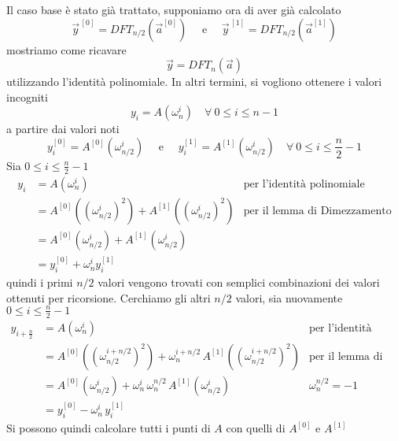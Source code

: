 Il caso base è stato già trattato, supponiamo ora di aver già calcolato 
\begin{equation*}
    \vec{y}^{\,[0]} = DFT_{n/2} \left( \vec{a}^{[0]} \right)
    \quad \text{ e } \quad
    \vec{y}^{\,[1]} = DFT_{n/2} \left( \vec{a}^{[1]} \right)
\end{equation*}
mostriamo come ricavare
\begin{equation*}
    \vec{y} = DFT_{n} \left( \vec{a} \right)
\end{equation*}
utilizzando l'identità polinomiale.
In altri termini, si vogliono ottenere i valori incogniti 
\begin{equation*}
    y_i = A \left( \omega_{n}^{i} \right)
    \quad \forall \: 0 \leq i \leq n-1
\end{equation*}
a partire dai valori noti
\begin{equation*}
    y_i^{[0]} = A^{[0]} \left( \omega_{n/2}^{i} \right)
    \quad \text{ e } \quad
    y_i^{[1]} = A^{[1]} \left( \omega_{n/2}^{i} \right)
    \quad \forall \: 0 \leq i \leq \frac{n}{2}-1
\end{equation*}
Sia $0 \leq i \leq \frac{n}{2}-1$
\begin{align*}
    y_i &= A \left( \omega_{n}^{i} \right) 
    & \text{per l'identità polinomiale}
    \\
    &= A^{[0]} \left( \left( \omega_{n/2}^{i} \right)^2 \right) +
    A^{[1]} \left( \left( \omega_{n/2}^{i} \right)^2 \right)
    & \text{per il lemma di Dimezzamento}
    \\
    &= A^{[0]} \left( \omega_{n/2}^{i} \right) +
    A^{[1]} \left( \omega_{n/2}^{i} \right)
    \\
    &= y_i^{[0]} + \omega_{n}^{i} y_i^{[1]} 
\end{align*}
quindi i primi $n/2$ valori vengono trovati con semplici combinazioni dei valori ottenuti per ricorsione. Cerchiamo gli altri $n/2$ valori, sia nuovamente $0 \leq i \leq \frac{n}{2}-1$
\begin{align*}
    y_{i+\frac{n}{2}} &= A \left( \omega_{n}^{i} \right) 
    & \text{per l'identità polinomiale}
    \\
    &= A^{[0]} \left( \left( \omega_{n/2}^{i+n/2} \right)^2 \right) +
    \omega_{n}^{i+n/2} \,
    A^{[1]} \left( \left( \omega_{n/2}^{i+n/2} \right)^2 \right)
    & \text{per il lemma di Dimezzamento}
    \\
    &= A^{[0]} \left( \omega_{n/2}^{i} \right) +
    \omega_{n}^{i} \,
    \omega_{n}^{n/2} \,
    A^{[1]} \left( \omega_{n/2}^{i} \right)
    & \omega_{n}^{n/2} = -1
    \\
    &= y_i^{[0]} - \omega_{n}^{i} \, y_i^{[1]} 
\end{align*}
Si possono quindi calcolare tutti i punti di $A$ con quelli di $ A^{[0]} $ e $ A^{[1]}$

